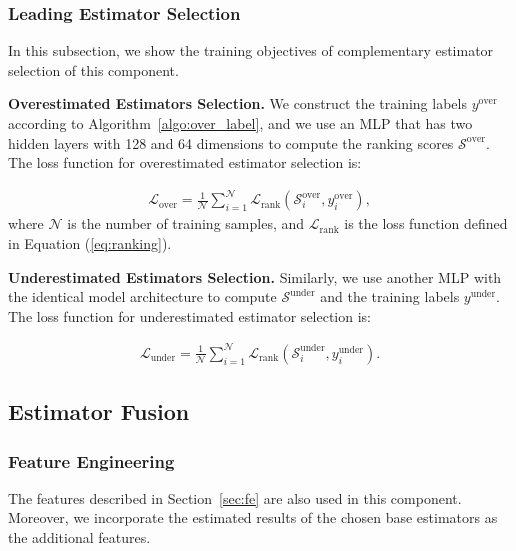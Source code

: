 \subsubsection{Leading Estimator Selection} In this subsection, we show the training objectives of complementary estimator selection of this component.



\noindent\textbf{Overestimated Estimators Selection.}
We construct the training labels $y^{\mathrm{over}}$ according to Algorithm~\ref{algo:over_label}, and we use an MLP that has two hidden layers with 128 and 64 dimensions to compute the ranking scores $\mathcal{S}^{\mathrm{over}}$. The loss function for overestimated estimator selection is:

\begin{align}
    \mathcal{L}_{\mathrm{over}}=\frac{1}{\mathcal{N}}\sum_{i=1}^\mathcal{N}\mathcal{L}_{\mathrm{rank}}({\mathcal{S}_i^{\mathrm{over}}},y^{\mathrm{over}}_i),
    \label{eq:loss-over}
\end{align}
where $\mathcal{N}$ is the number of training samples, and $\mathcal{L}_{\mathrm{rank}}$ is the loss function defined in Equation (\ref{eq:ranking}). 



\noindent\textbf{Underestimated Estimators Selection.} Similarly, we use another MLP with the identical model architecture to compute $\mathcal{S}^{\mathrm{under}}$ and the training labels $y^{\mathrm{under}}$.  The loss function for underestimated estimator selection is:

\begin{align}
    \mathcal{L}_{\mathrm{under}}=\frac{1}{\mathcal{N}}\sum_{i=1}^\mathcal{N}\mathcal{L}_{\mathrm{rank}}({\mathcal{S}_i^{\mathrm{under}}},y^{\mathrm{under}}_i).
    \label{eq:loss-under}
\end{align}










\subsection{Estimator Fusion}\label{sec:exploit}
\subsubsection{Feature Engineering} The features described in Section~\ref{sec:fe} are also used in this component. Moreover, we incorporate the estimated results of the chosen base estimators as the additional features. 

